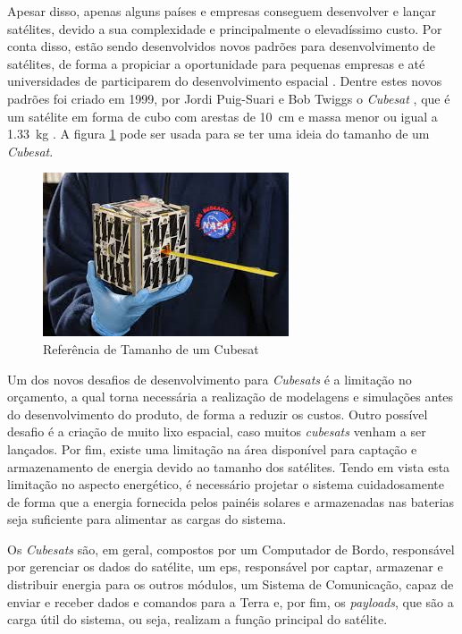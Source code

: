 Apesar disso, apenas alguns países e empresas conseguem desenvolver e lançar satélites, devido a sua complexidade e principalmente o elevadíssimo custo. Por conta disso, estão sendo desenvolvidos novos padrões para desenvolvimento de satélites, de forma a propiciar a oportunidade para pequenas empresas e até universidades de participarem do desenvolvimento espacial \cite{Baker2008}. Dentre estes novos padrões foi criado em 1999, por Jordi Puig-Suari e Bob Twiggs o \textit{Cubesat} \cite{Messier2015}, que é um satélite em forma de cubo com arestas de \SI{10}{\centi\metre} e massa menor ou igual a \SI{1,33}{\kilo\gram} \cite{cubesatDesignSpecification2014}. A figura \ref{figura_cubesat} pode ser usada para se ter uma ideia do tamanho de um \textit{Cubesat}.

\begin{figure}[!htpb]
\begin{center}
\includegraphics[scale=0.5]{figures/cubesat.jpg}
\caption{Referência de Tamanho de um Cubesat}
\label{figura_cubesat}
\end{center}
\end{figure}

Um dos novos desafios de desenvolvimento para \textit{Cubesats} é a limitação no orçamento, a qual torna necessária a realização de modelagens e simulações antes do desenvolvimento do produto, de forma a reduzir os custos. Outro possível desafio é a criação de muito lixo espacial, caso muitos \textit{cubesats} venham a ser lançados. Por fim, existe uma limitação na área disponível para captação e armazenamento de energia devido ao tamanho dos satélites\cite{Kalman2011}. Tendo em vista esta limitação no aspecto energético, é necessário projetar o sistema cuidadosamente de forma que a energia fornecida pelos painéis solares e armazenadas nas baterias seja suficiente para alimentar as cargas do sistema.

Os \textit{Cubesats} são, em geral, compostos por um Computador de Bordo, responsável por gerenciar os dados do satélite, um \gls{eps}, responsável por captar, armazenar e distribuir energia para os outros módulos, um Sistema de Comunicação, capaz de enviar e receber dados e comandos para a Terra e, por fim, os \textit{payloads}, que são a carga útil do sistema, ou seja, realizam a função principal do satélite.

